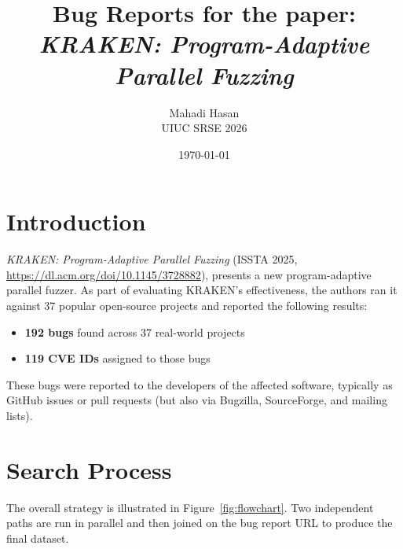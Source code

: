 \documentclass[11pt,a4paper]{article}
\title{\textbf{Bug Reports for the paper:\\
\textit{KRAKEN: Program-Adaptive Parallel Fuzzing}}}
\author{Mahadi Hasan \\ \small UIUC SRSE 2026}
\date{\today}
\begin{document}
\maketitle
\thispagestyle{fancy}


\tableofcontents
\newpage

\section{Introduction}

\textit{KRAKEN: Program-Adaptive Parallel Fuzzing} (ISSTA 2025,
\url{https://dl.acm.org/doi/10.1145/3728882}), presents a new program-adaptive parallel
fuzzer. As part of evaluating KRAKEN's effectiveness, the authors ran it against 37
popular open-source projects and reported the following results:
\begin{itemize}[nosep]
    \item \textbf{192 bugs} found across 37 real-world projects
    \item \textbf{119 CVE IDs} assigned to those bugs
\end{itemize}
These bugs were reported to the developers of the affected software, typically as GitHub
issues or pull requests (but also via Bugzilla, SourceForge, and mailing lists).

\section{Search Process}

The overall strategy is illustrated in Figure~\ref{fig:flowchart}. Two independent paths
are run in parallel and then joined on the bug report URL to produce the final dataset.
\end{document}
